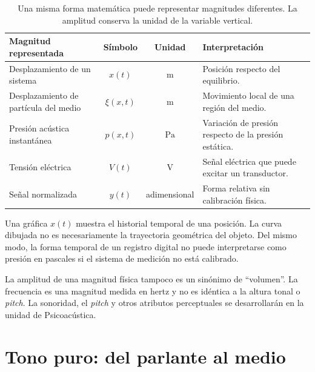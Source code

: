 \begin{table}[htbp]
    \centering
    \small
    \setlength{\tabcolsep}{5pt}
    \begin{tabular}{|>{\raggedright\arraybackslash}p{}|c|c|>{\raggedright\arraybackslash}p{}|}
        \hline
        \textbf{Magnitud representada} & \textbf{Símbolo} &
        \textbf{Unidad} & \textbf{Interpretación} \\
        \hline
        Desplazamiento de un sistema & \(x(t)\) & \(\text{m}\) &
        Posición respecto del equilibrio. \\
        \hline
        Desplazamiento de partícula del medio & \(\xi(x,t)\) & \(\text{m}\) &
        Movimiento local de una región del medio. \\
        \hline
        Presión acústica instantánea & \(p(x,t)\) & \(\text{Pa}\) &
        Variación de presión respecto de la presión estática. \\
        \hline
        Tensión eléctrica & \(V(t)\) & \(\text{V}\) &
        Señal eléctrica que puede excitar un transductor. \\
        \hline
        Señal normalizada & \(y(t)\) & adimensional &
        Forma relativa sin calibración física. \\
        \hline
    \end{tabular}
    \caption{Una misma forma matemática puede representar magnitudes
    diferentes. La amplitud conserva la unidad de la variable vertical.}
    \label{tab:u3-variables-sinusoidales}
\end{table}

Una gráfica \(x(t)\) muestra el historial temporal de una posición. La curva
dibujada no es necesariamente la trayectoria geométrica del objeto. Del mismo
modo, la forma temporal de un registro digital no puede interpretarse como
presión en pascales si el sistema de medición no está calibrado.

La amplitud de una magnitud física tampoco es un sinónimo de ``volumen''. La
frecuencia es una magnitud medida en hertz y no es idéntica a la altura tonal
o \emph{pitch}.  La sonoridad, el
\emph{pitch} y otros atributos perceptuales se desarrollarán en la unidad de
Psicoacústica.

\section{Tono puro: del parlante al medio}
\label{sec:u3-tono-puro}

